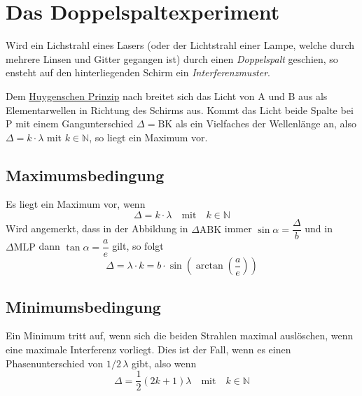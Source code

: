 \documentclass{article}
\begin{document}
\section{Das Doppelspaltexperiment} 
Wird ein Lichstrahl eines Lasers (oder der Lichtstrahl einer Lampe, welche durch mehrere Linsen und Gitter gegangen ist) durch einen \emph{Doppelspalt} geschien, so ensteht auf den hinterliegenden Schirm ein \emph{Interferenzmuster}. 
 
\noindent \begin{minipage}{\dimexpr\linewidth-8cm}
 Dem \hyperref[Ausbreitung]{Huygenschen Prinzip} nach breitet sich das Licht von A und B aus als Elementarwellen in Richtung des Schirms aus. Kommt das Licht beide Spalte bei P mit einem Gangunterschied $\Delta = \text{BK}$ als ein Vielfaches der Wellenlänge an, also $\Delta = k \cdot \lambda$ mit $k \in \mathbb{N}$, so liegt ein Maximum vor.
\end{minipage} 
\hfill 
\begin{minipage}{7.5cm}
 \center
\end{minipage} 
\subsection{Maximumsbedingung}
Es liegt ein Maximum vor, wenn
\[
 \Delta = k \cdot \lambda
 \quad \text{mit} \quad
 k \in \mathbb{N}
\] 
Wird angemerkt, dass in der Abbildung in $\Delta \text{ABK}$ immer $\sin\alpha = \dfrac{\Delta}{b}$ und in $\Delta \text{MLP}$ dann ${\tan\alpha = \dfrac{a}{e}}$ gilt, so folgt
\[
 \Delta = \lambda \cdot k = b \cdot \sin{\left(\arctan{\left(\frac{a}{e}\right)}\right)} 
\]
\subsection{Minimumsbedingung}
Ein Minimum tritt auf, wenn sich die beiden Strahlen maximal auslöschen, wenn eine maximale Interferenz vorliegt. Dies ist der Fall, wenn es einen Phasenunterschied von $1/2 \,\lambda$ gibt, also wenn
\[
 \Delta = \frac{1}{2} \left(2k+1\right) \lambda
 \quad \text{mit} \quad
 k \in \mathbb{N}
\] 
\end{document}
